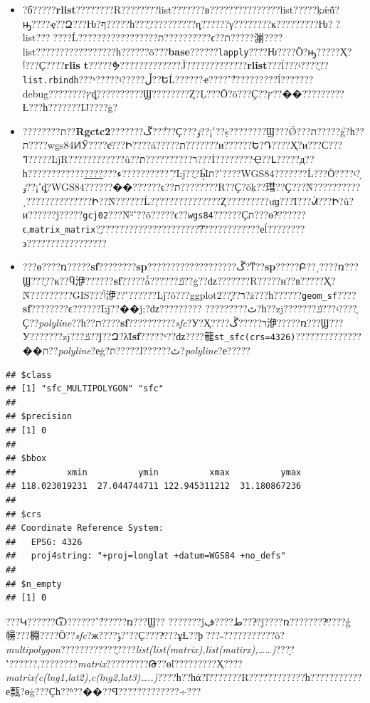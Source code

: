 \documentclass[]{article}
\begin{document}
\begin{itemize}
\item
  ?б?????\textbf{rlist}????????R????????list???????в???????????????list?????ķǽṹ?ԣ????ҿ??Զ???Ƕ?ף?????һ???ַ??????????ηָ??????γ????????ĸ?????????Ƕ?׵?list???󣬺????Ĺ?????????????????ת??????????ϵ??ת?????漰????list?????????????????һ??????õ???\textbf{base}??????\texttt{lapply}????Ƕ????Ӧ?ԣ?????Ҳ?ٲ???Ҫ????\textbf{rlis
  t}?????ܶຯ?????????????Ĵ?????????????\textbf{rlist}???ĺ???ʵ????ֻ??\texttt{list.rbind}һ???ˣ?????ʵ?????ڵ??ԵĹ??????ҽ????˺ܶ??????????ĺ???????debug????????ץȡ??????????Ϣ????????Ȥ?Ļ???Ӧ?ö???Ҫ??ץ??��?????????Ƚ???һ???????Ĳ????ġ?
\item
  ????????ת??\textbf{Rgctc2}???????ڱ??ܵ???Ҫ???ߵ¡??ٶ??ṩ????????Ϣ???Ǿ???ת?????ܵģ?һ??ת????wgs84ͶӰ????ϵͨ???Ի????á?????ת???????и??????Ե?Դ????Ҳ?и???С???ߣ?????ĿǰR????????????û??ר??????????ת???İ????????Ҿ??Լ?????д??һ????????????\href{https://github.com/zhouqiangnju/R_coordination_transformation}{????}???ء??????????ܼܺ򵥣?Ŀǰ??ֻ?ܴӸߵ?ת????WGS84???????Ĺ???Ӧ????ʵ?ָߵ¡??ٶȡ?WGS84??????��??????ϵ??ת????????R??Ҫ?õķ??㻰??Ҫ???Ǹ??????????͵??????????????Ի??Ǹ??????Ĺ??̣?????????????Ȥ?????????ưɡ???Ϊ???ᣬ???Ի?û?и??????ĵ?????\texttt{gcj02}???Ǹߵ²??õ?????ϵ??\texttt{wgs84}??????Ҫת???ɵ?ͨ??????ϵ,\texttt{matrix\_matrix}?ֱ??????????????????????͡????????????еĺ????????϶?????????????????
\item
  ???ɵ????ռ?????\textbf{sf}????????\textbf{sp}???????????????????ڴ?ͳ??\textbf{sp}?????Բ??͵????ռ???Ϣ???ָ??ĸ??Ӵ洢??????\textbf{sf}?????ǻ??????ݿ??ģ??ǳ???????R?????н??в?????Ҳ?Ǹ?????????GIS???ݴ洢??ʽ??????Ŀǰ?õ???ggplot2??֧?֣?ר?ż???һ??????\texttt{geom\_sf}????\textbf{sf}????????ͼ??????Ŀǰ??��ǰ;?ǳ?????????
  ?????????ٿ?һ??zj???????ݿ???ʵ????ֻҪ??\emph{polyline}??һ??ת????\textbf{sf}??????????\emph{sfc}?У?Ҳ????ר?????ڴ洢?????ռ???Ϣ???У???????zj???ݿ??Ϳ??Զ?λΪ\textbf{sf}?????ˣ??ǳ????㡣\texttt{st\_sfc(crs=4326)}??????????????��ת??\emph{polyline}?еġ?ת?????ɺ??????ٿ?\emph{polyline}?е?????
\end{itemize}

\begin{verbatim}
## $class
## [1] "sfc_MULTIPOLYGON" "sfc"             
## 
## $precision
## [1] 0
## 
## $bbox
##          xmin          ymin          xmax          ymax 
## 118.023019231  27.044744711 122.945311212  31.180867236 
## 
## $crs
## Coordinate Reference System:
##   EPSG: 4326 
##   proj4string: "+proj=longlat +datum=WGS84 +no_defs"
## 
## $n_empty
## [1] 0
\end{verbatim}

???Կ??????Ѿ??????˺ܶ??????ռ???Ϣ??
???????ĵط????ڣ???ͬ?ĵ????ռ????????ͣ????ǵ㡢???棩????Ӧ??\emph{sfc}?ж????ݸ?ʽ??Ҫ????ͬ???ұȽ??ϸ񣬱???˵???????????õ?\emph{multipolygon}????????????ֻ????\emph{list(list(matrix),list(matirx),\ldots{}\ldots{})}???ָ?ʽ??????,????????\emph{matrix}?????????Թ??ɵľ?????????Ҳ????\emph{matrix(c(lng1,lat2),c(lng2,lat3)\ldots{}..)}????һ??һά?ľ???????R????????????һ???????????е㼼?ɵģ???Ҫһ??ʱ??��??Ϥ?????????????÷???
\end{document}
